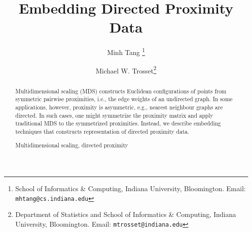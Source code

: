 \documentclass[11pt]{asaproc}
\title{Embedding Directed Proximity Data}
\author{Minh Tang \thanks{School of Informatics \& Computing, Indiana
    University, Bloomington.  Email: \mbox{\tt mhtang@cs.indiana.edu}} 
\and Michael W. Trosset\thanks{Department of
    Statistics and School of Informatics \& Computing, Indiana University, 
Bloomington.  Email: \mbox{\tt mtrosset@indiana.edu}}}
\begin{document}
\maketitle
\begin{abstract}
Multidimensional scaling (MDS) constructs Euclidean configurations of
points from symmetric pairwise proximities, i.e., the edge weights of
an undirected graph. In some applications, however, proximity is
asymmetric, e.g., nearest neighbour graphs are directed. In such
cases, one might symmetrize the proximity matrix and apply traditional
MDS to the symmetrized proximities. Instead, we describe embedding
techniques that constructs representation of directed proximity data.
\begin{keywords}
Multidimensional scaling, directed proximity
\end{keywords}
\end{abstract}
\end{document}
